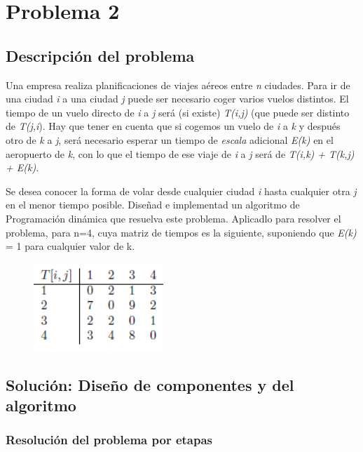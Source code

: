 \chapter{Problema 2}

\section{Descripción del problema}

Una empresa realiza planificaciones de viajes aéreos entre \textit{n} ciudades. Para ir de una ciudad \textit{i} a una ciudad \textit{j} puede ser necesario coger varios vuelos distintos. El tiempo de un vuelo directo de \textit{i} a \textit{j} será (si existe) \textit{T(i,j)} (que puede ser distinto de \textit{T(j,i}). Hay que tener en cuenta que si cogemos un vuelo de \textit{i} a \textit{k} y después otro de \textit{k} a \textit{j}, será necesario esperar un tiempo de \textit{escala} adicional \textit{E(k)} en el aeropuerto de \textit{k}, con lo que el tiempo de ese viaje de \textit{i} a \textit{j} será de \textit{T(i,k) + T(k,j) + E(k)}.

Se desea conocer la forma de volar desde cualquier ciudad \textit{i} hasta cualquier otra \textit{j} en el menor tiempo posible. Diseñad e implementad un algoritmo de Programación dinámica que resuelva este problema. Aplicadlo para resolver el problema, para n=4, cuya matriz de tiempos es la siguiente, suponiendo que \textit{E(k)} = 1 para cualquier valor de k.

\begin{figure}
    \centering
    \includegraphics[width=0.5\linewidth]{figures/problema2/tabla2.png}
\end{figure}

\section{Solución: Diseño de componentes y del algoritmo}


\subsection{Resolución del problema por etapas}

